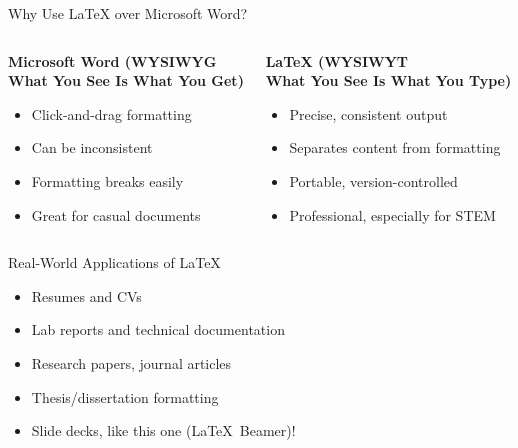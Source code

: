 \documentclass[x11names]{beamer} %
\begin{document}
\begin{frame}{Why Use \LaTeX{} over Microsoft Word?}
    \begin{columns}
        \begin{column}{0.48\textwidth}
        \textbf{Microsoft Word (WYSIWYG\\[0.1em] \scriptsize{What You See Is What You Get})}
        \begin{itemize}
            \item Click-and-drag formatting
            \item Can be inconsistent
            \item Formatting breaks easily
            \item Great for casual documents
        \end{itemize}
        \end{column}
        \begin{column}{0.48\textwidth}
        \textbf{\LaTeX{} (WYSIWYT\\[0.1em] \scriptsize{What You See Is What You Type})}
        \begin{itemize}
            \item Precise, consistent output
            \item Separates content from formatting
            \item Portable, version-controlled
            \item Professional, especially for STEM
        \end{itemize}
        \end{column}
    \end{columns}
    \end{frame}    

\begin{frame}{Real-World Applications of \LaTeX}
\begin{itemize}
    \item Resumes and CVs
    \item Lab reports and technical documentation
    \item Research papers, journal articles
    \item Thesis/dissertation formatting
    \item Slide decks, like this one (\LaTeX\ Beamer)!
\end{itemize}
\end{frame}
\end{document}
